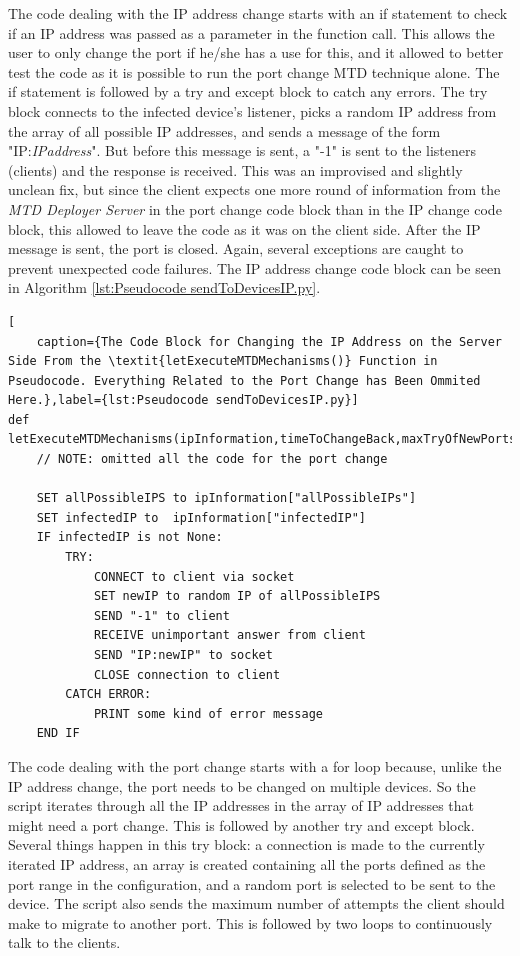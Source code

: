The code dealing with the IP address change starts with an if statement to check if an IP address was passed as a parameter in the function call. This allows the user to only change the port if he/she has a use for this, and it allowed to better test the code as it is possible to run the port change MTD technique alone. The if statement is followed by a try and except block to catch any errors. The try block connects to the infected device's listener, picks a random IP address from the array of all possible IP addresses, and sends a message of the form "IP:\textit{IPaddress}". But before this message is sent, a "-1" is sent to the listeners (clients) and the response is received. This was an improvised and slightly unclean fix, but since the client expects one more round of information from the \textit{MTD Deployer Server} in the port change code block than in the IP change code block, this allowed to leave the code as it was on the client side. After the IP message is sent, the port is closed. Again, several exceptions are caught to prevent unexpected code failures. The IP address change code block can be seen in Algorithm \ref{lst:Pseudocode sendToDevicesIP.py}.
\\

\begin{lstlisting}[                
    caption={The Code Block for Changing the IP Address on the Server Side From the \textit{letExecuteMTDMechanisms()} Function in Pseudocode. Everything Related to the Port Change has Been Ommited Here.},label={lst:Pseudocode sendToDevicesIP.py}]
def letExecuteMTDMechanisms(ipInformation,timeToChangeBack,maxTryOfNewPorts,startOfPossiblePorts,endOfPossiblePorts):
    // NOTE: omitted all the code for the port change
    
    SET allPossibleIPS to ipInformation["allPossibleIPs"]
    SET infectedIP to  ipInformation["infectedIP"]
    IF infectedIP is not None:
        TRY:
            CONNECT to client via socket
            SET newIP to random IP of allPossibleIPS
            SEND "-1" to client
            RECEIVE unimportant answer from client
            SEND "IP:newIP" to socket
            CLOSE connection to client
        CATCH ERROR:
            PRINT some kind of error message
    END IF
\end{lstlisting}

The code dealing with the port change starts with a for loop because, unlike the IP address change, the port needs to be changed on multiple devices. So the script iterates through all the IP addresses in the array of IP addresses that might need a port change. This is followed by another try and except block. Several things happen in this try block: a connection is made to the currently iterated IP address, an array is created containing all the ports defined as the port range in the configuration, and a random port is selected to be sent to the device. The script also sends the maximum number of attempts the client should make to migrate to another port. This is followed by two loops to continuously talk to the clients.

